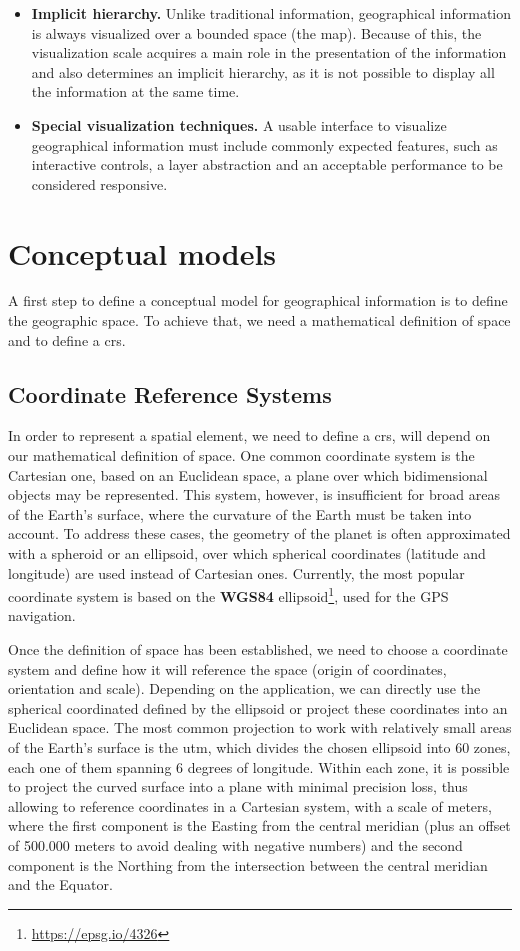 \begin{itemize}
        \item \textbf{Implicit hierarchy.} Unlike traditional information, geographical information is always visualized over a bounded space (the map). Because of this, the visualization scale acquires a main role in the presentation of the information and also determines an implicit hierarchy, as it is not possible to display all the information at the same time.
        
        \item \textbf{Special visualization techniques.} A usable interface to visualize geographical information must include commonly expected features, such as interactive controls, a layer abstraction and an acceptable performance to be considered responsive.
    \end{itemize}
    
    \section{Conceptual models}
    A first step to define a conceptual model for geographical information is to define the geographic space. To achieve that, we need a mathematical definition of space and to define a \gls{crs}.
    
    \subsection{Coordinate Reference Systems}
    In order to represent a spatial element, we need to define a \gls{crs}, will depend on our mathematical definition of space. One common coordinate system is the Cartesian one, based on an Euclidean space, a plane over which bidimensional objects may be represented. This system, however, is insufficient for broad areas of the Earth's surface, where the curvature of the Earth must be taken into account. To address these cases, the geometry of the planet is often approximated with a spheroid or an ellipsoid, over which spherical coordinates (latitude and longitude) are used instead of Cartesian ones. Currently, the most popular coordinate system is based on the \textbf{WGS84} ellipsoid\footnote{\url{https://epsg.io/4326}}, used for the GPS navigation.
    
    Once the definition of space has been established, we need to choose a coordinate system and define how it will reference the space (origin of coordinates, orientation and scale). Depending on the application, we can directly use the spherical coordinated defined by the ellipsoid or project these coordinates into an Euclidean space. The most common projection to work with relatively small areas of the Earth's surface is the \gls{utm}, which divides the chosen ellipsoid into 60 zones, each one of them spanning 6 degrees of longitude. Within each zone, it is possible to project the curved surface into a plane with minimal precision loss, thus allowing to reference coordinates in a Cartesian system, with a scale of meters, where the first component is the Easting from the central meridian (plus an offset of 500.000 meters to avoid dealing with negative numbers) and the second component is the Northing from the intersection between the central meridian and the Equator.
    
